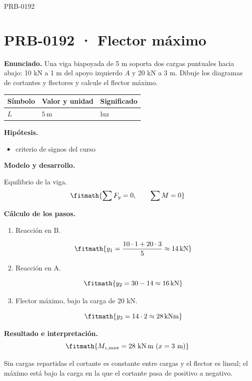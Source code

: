 \begin{studiumworked}{PRB-0192}

\section{PRB-0192 · Flector máximo}

\textbf{Enunciado.} Una viga biapoyada de 5 m soporta dos cargas puntuales hacia abajo: 10 kN a 1 m del apoyo izquierdo $A$ y 20 kN a 3 m. Dibuje los diagramas de cortantes y flectores y calcule el flector máximo.

\par\medskip\noindent\begin{tabular}{@{}p{.18\linewidth}p{.26\linewidth}p{.48\linewidth}@{}}
\toprule Símbolo & Valor y unidad & Significado\\\midrule
$L$ & $5\,\mathrm{m}$ & luz\\
\bottomrule\end{tabular}\par\medskip

\textbf{Hipótesis.}\begin{itemize}\item criterio de signos del curso\end{itemize}

\textbf{Modelo y desarrollo.}

Equilibrio de la viga.\[\fitmath{\sum F_y = 0,\qquad \sum M = 0}\]

\textbf{Cálculo de los pasos.}

\begin{enumerate}

\item Reacción en B.

\[\fitmath{y_{1}=\frac{10\cdot 1+20\cdot 3}{5}\approx 14\,\mathrm{kN}}\]

\item Reacción en A.

\[\fitmath{y_{2}=30-14\approx 16\,\mathrm{kN}}\]

\item Flector máximo, bajo la carga de 20 kN.

\[\fitmath{y_{3}=14\cdot 2\approx 28\,\mathrm{kN m}}\]

\end{enumerate}

\textbf{Resultado e interpretación.}\[\fitmath{M_{z,\max} = 28\ \mathrm{kN\,m}\ (x = 3\ \mathrm{m})}\]

Sin cargas repartidas el cortante es constante entre cargas y el flector es lineal; el máximo está bajo la carga en la que el cortante pasa de positivo a negativo.


\end{studiumworked}
